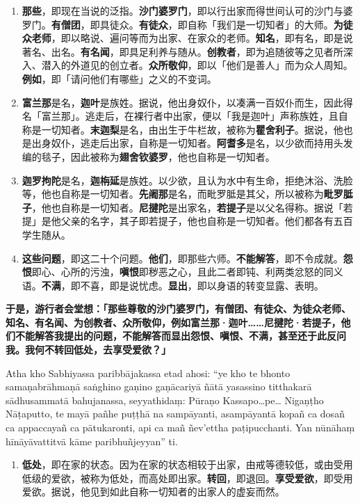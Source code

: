 \begin{enumerate}\item \textbf{那些}，即现在当说的泛指。\textbf{沙门婆罗门}，即以行出家而得世间认可的沙门与婆罗门。\textbf{有僧团}，即具徒众。\textbf{有徒众}，即自称「我们是一切知者」的大师。\textbf{为徒众老师}，即以略说、遍问等而为出家、在家众的老师。\textbf{知名}，即有名，即是说著名、出名。\textbf{有名闻}，即具足利养与随从。\textbf{创教者}，即为追随彼等之见者所深入、潜入的外道见的创立者。\textbf{众所敬仰}，即以「他们是善人」而为众人周知。\textbf{例如}，即「请问他们有哪些」之义的不变词。
\item \textbf{富兰那}是名，\textbf{迦叶}是族姓。据说，他出身奴仆，以凑满一百奴仆而生，因此得名「富兰那」。逃走后，在裸行者中出家，便以「我是迦叶」声称族姓，且自称是一切知者。\textbf{末迦梨}是名，由出生于牛栏故，被称为\textbf{瞿舍利子}。据说，他也是出身奴仆，逃走后出家，自称是一切知者。\textbf{阿耆多}是名，以少欲而持用头发编的毯子，因此被称为\textbf{翅舍钦婆罗}，他也自称是一切知者。
\item \textbf{迦罗拘陀}是名，\textbf{迦栴延}是族姓。以少欲，且认为水中有生命，拒绝沐浴、洗脸等，他也自称是一切知者。\textbf{先阇那}是名，而毗罗胝是其父，所以被称为\textbf{毗罗胝子}，他也自称是一切知者。\textbf{尼揵陀}是出家名，\textbf{若提子}是以父名得称。据说「若提」是他父亲的名字，其子即若提子，他也自称是一切知者。他们都各有五百学生随从。
\item \textbf{这些问题}，即这二十个问题。\textbf{他们}，即那些六师。\textbf{不能解答}，即不令成就。\textbf{怨恨}即心、心所的污浊，\textbf{嗔恨}即秽恶之心，且此二者即钝、利两类忿怒的同义语。\textbf{不满}，即不喜，即是说忧虑。\textbf{显出}，即以身语的转变显露、表明。\end{enumerate}

\textbf{于是，游行者会堂想：「那些尊敬的沙门婆罗门，有僧团、有徒众、为徒众老师、知名、有名闻、为创教者、众所敬仰，例如富兰那·迦叶……尼揵陀·若提子，他们不能解答我提出的问题，不能解答而显出怨恨、嗔恨、不满，甚至还于此反问我。我何不转回低处，去享受爱欲？」}

Atha kho Sabhiyassa paribbājakassa etad ahosi: “ye kho te bhonto samaṇabrāhmaṇā saṅghino gaṇino gaṇācariyā ñātā yasassino titthakarā sādhusammatā bahujanassa, seyyathidaṃ: Pūraṇo Kassapo…pe… Nigaṇṭho Nāṭaputto, te mayā pañhe puṭṭhā na sampāyanti, asampāyantā kopañ ca dosañ ca appaccayañ ca pātukaronti, api ca mañ ñev’ettha paṭipucchanti. Yan nūnāhaṃ hīnāyāvattitvā kāme paribhuñjeyyan” ti.

\begin{enumerate}\item \textbf{低处}，即在家的状态。因为在家的状态相较于出家，由戒等德较低，或由受用低级的爱欲，被称为低处，而高处即出家。\textbf{转回}，即退回。\textbf{享受爱欲}，即受用爱欲。据说，他见到如此自称一切知者的出家人的虚妄而然。\end{enumerate}

